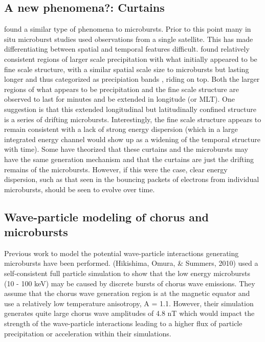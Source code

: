 \documentclass[referee,a4paper,12pt,traditabstract]{swsc}
\begin{document}
\begin{linenumbers}
\subsection{A new phenomena?: Curtains}
\citet{Blake2016} found a similar type of phenomena to microbursts. Prior to this point many in situ microburst studies used observations from a single satellite. This has made differentiating between spatial and temporal features difficult. \citet{Blake2016} found relatively consistent regions of larger scale precipitation with what initially appeared to be fine scale structure, with a similar spatial scale size to microbursts but lasting longer and thus categorized as precipiation bands \citep[e.g.][and references therein]{Greeley2019}, riding on top. Both the larger regions of what appears to be precipitation and the fine scale structure are observed to last for minutes and be extended in longitude (or MLT). One suggestion is that this extended longitudinal but latitudinally confined structure is a series of drifting microbursts. Interestingly, the fine scale structure appears to remain consistent with a lack of strong energy dispersion (which in a large integrated energy channel would show up as a widening of the temporal structure with time). Some have theorized that these curtains and the microbursts may have the same generation mechanism and that the curtains are just the drifting remains of the microbursts. However, if this were the case, clear energy dispersion, such as that seen in the bouncing packets of electrons from individual microbursts, should be seen to evolve over time.  






\subsection{Wave-particle modeling of chorus and microbursts}

Previous work to model the potential wave-particle interactions generating microbursts have been performed. (Hikishima, Omura, \& Summers, 2010) used a self-consistent full particle simulation to show that the low energy microbursts (10 - 100 keV) may be caused by discrete bursts of chorus wave emissions. They assume that the chorus wave generation region is at the magnetic equator and use a relatively low temperature anisotropy, A = 1.1. However, their simulation generates quite large chorus wave amplitudes of 4.8 nT which would impact the strength of the wave-particle interactions leading to a higher flux of particle precipitation or acceleration within their simulations. 


\end{linenumbers}
\end{document}
